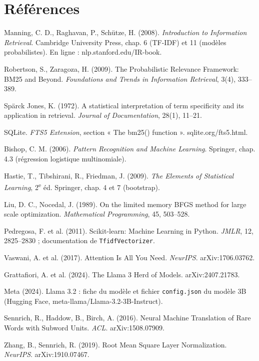 \documentclass[11pt,a4paper]{article}
\begin{document}
\section*{Références}
\small
\begin{enumerate}[label={[\arabic*]}]
\item Manning, C. D., Raghavan, P., Schütze, H. (2008). \emph{Introduction to Information Retrieval}. Cambridge University Press, chap. 6 (TF-IDF) et 11 (modèles probabilistes). En ligne : nlp.stanford.edu/IR-book.
\item Robertson, S., Zaragoza, H. (2009). The Probabilistic Relevance Framework: BM25 and Beyond. \emph{Foundations and Trends in Information Retrieval}, 3(4), 333--389.
\item Spärck Jones, K. (1972). A statistical interpretation of term specificity and its application in retrieval. \emph{Journal of Documentation}, 28(1), 11--21.
\item SQLite. \emph{FTS5 Extension}, section « The bm25() function ». sqlite.org/fts5.html.
\item Bishop, C. M. (2006). \emph{Pattern Recognition and Machine Learning}. Springer, chap. 4.3 (régression logistique multinomiale).
\item Hastie, T., Tibshirani, R., Friedman, J. (2009). \emph{The Elements of Statistical Learning}, 2\textsuperscript{e} éd. Springer, chap. 4 et 7 (bootstrap).
\item Liu, D. C., Nocedal, J. (1989). On the limited memory BFGS method for large scale optimization. \emph{Mathematical Programming}, 45, 503--528.
\item Pedregosa, F. et al. (2011). Scikit-learn: Machine Learning in Python. \emph{JMLR}, 12, 2825--2830 ; documentation de \texttt{TfidfVectorizer}.
\item Vaswani, A. et al. (2017). Attention Is All You Need. \emph{NeurIPS}. arXiv:1706.03762.
\item Grattafiori, A. et al. (2024). The Llama 3 Herd of Models. arXiv:2407.21783.
\item Meta (2024). Llama 3.2 : fiche du modèle et fichier \texttt{config.json} du modèle 3B (Hugging Face, meta-llama/Llama-3.2-3B-Instruct).
\item Sennrich, R., Haddow, B., Birch, A. (2016). Neural Machine Translation of Rare Words with Subword Units. \emph{ACL}. arXiv:1508.07909.
\item Zhang, B., Sennrich, R. (2019). Root Mean Square Layer Normalization. \emph{NeurIPS}. arXiv:1910.07467.

\end{enumerate}
\end{document}
